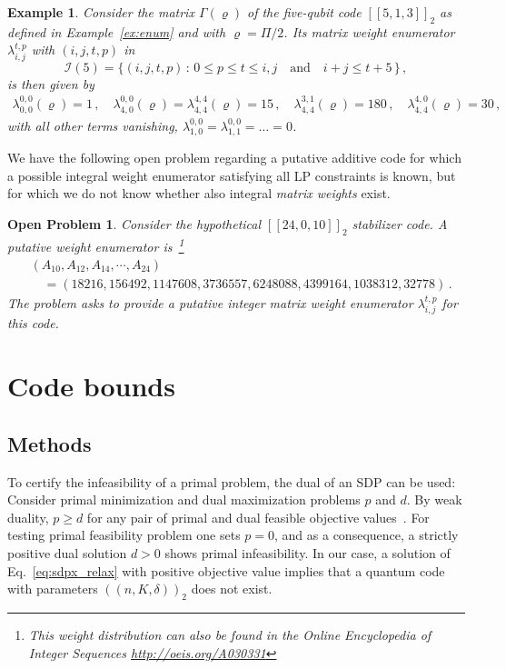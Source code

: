 \documentclass[12pt,a4paper]{amsart}
\newtheorem{example}[theorem]{Example}
\newtheorem{problem}{Open Problem}
\newcommand{\II}{\mathcal{I}}
\newcommand{\nn}{\nonumber}
\begin{document}
\begin{example}
Consider the matrix $\Gamma(\varrho)$ of the five-qubit code $[\![5,1,3]\!]_2$ as defined in Example~\ref{ex:enum} and with $\varrho=\Pi/2$.
% 
Its matrix weight enumerator $\lambda^{t,p}_{i,j}$ with $(i,j,t,p)$ in
% 
\begin{equation}
 \II(5)= \{ (i, j, t, p)\,:\, 0 \leq p \leq t \leq i,j \quad \text{and} \quad i+j \leq t+5\, \}\,,
\end{equation}
% 
is then given by
\begin{align}
\lambda^{0,0}_{0,0}(\varrho)= 1\,,\quad 
\lambda^{0,0}_{4,0}(\varrho) = \lambda^{4,4}_{4,4} (\varrho)= 15\,, \quad \lambda^{3,1}_{4,4}(\varrho)= 180\,, \quad
\lambda^{4,0}_{4,4} (\varrho)= 30\,,
% 
\end{align}
% 
with all other terms vanishing,
$\lambda^{0,0}_{1,0} = \lambda^{0,0}_{1,1} =\dots = 0$.
\end{example}

We have the following open problem regarding a putative additive code for which a possible integral weight enumerator satisfying all LP constraints is known, but for which we do not know whether also integral {\it matrix weights} exist.
\begin{problem}
Consider the hypothetical $[\![24,0,10]\!]_2$ stabilizer code. A putative weight enumerator is~\footnote{
This weight distribution can also be found in the Online Encyclopedia of Integer Sequences \href{A030331}{http://oeis.org/A030331}}
\begin{align}
&(A_{10}, A_{12}, A_{14}, \cdots,A_{24})  \nn\\ 
&\quad= 
(18216, 156492, 1147608, 3736557, 6248088, 4399164, 1038312, 32778)\,.
\end{align}
The problem asks to provide a putative integer matrix weight enumerator $\lambda^{t,p}_{i,j}$ for this code.
\end{problem}

\section{Code bounds}
\label{sec:cert}
\subsection{Methods}
To certify the infeasibility of a primal problem, 
the dual of an SDP can be used:
Consider primal minimization and dual maximization problems $p$ and $d$.
% 
By weak duality, $p \geq d$ for any pair of primal and dual feasible objective values~\cite{boyd2004convex}. 
For testing primal feasibility problem one sets $p=0$,
and as a consequence, a strictly positive dual solution 
$d > 0$ shows primal infeasibility.
% 
In our case, a solution of Eq.~\eqref{eq:sdpx_relax} with positive objective value implies that a quantum code 
with parameters $(\!(n,K,\delta)\!)_2$ does not exist.
\end{document}
